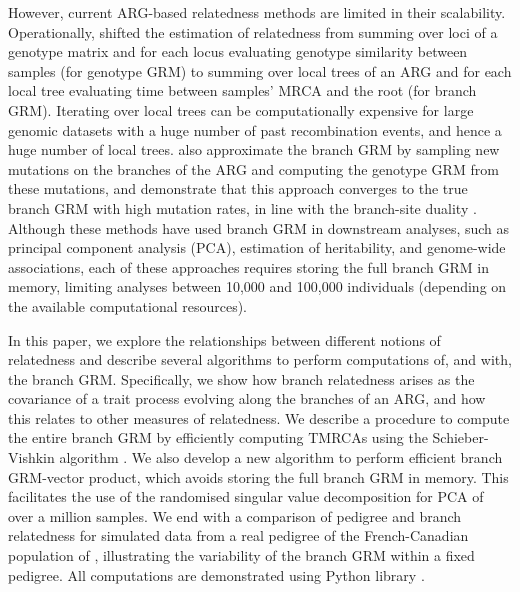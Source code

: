 However,
current ARG-based relatedness methods are limited in their scalability.
%
Operationally, \citet{fan2022genealogical} shifted the estimation of relatedness
from summing over loci of a genotype matrix and
for each locus evaluating genotype similarity between samples (for genotype GRM)
to summing over local trees of an ARG and
for each local tree evaluating time between samples' MRCA and the root (for branch GRM).
%
Iterating over local trees can be computationally expensive for large genomic datasets
with a huge number of past recombination events, and hence a huge number of local trees.
%
\citet{zhang2023biobank} also approximate the branch GRM
by sampling new mutations on the branches of the ARG and
computing the genotype GRM from these mutations,
and demonstrate that this approach converges to the true branch GRM with high mutation rates,
in line with the branch-site duality \citep{ralph2019empirical, ralph2020efficiently}.
%
Although these methods have used branch GRM in downstream analyses,
such as principal component analysis (PCA), estimation of heritability, and genome-wide associations,
each of these approaches requires storing the full branch GRM in memory,
limiting analyses between 10,000 and 100,000 individuals
(depending on the available computational resources).


In this paper, we explore the relationships between different notions of relatedness and
describe several algorithms to perform computations of, and with, the branch GRM.
%
Specifically, we show how branch relatedness arises as
the covariance of a trait process evolving along the branches of an ARG,
and how this relates to other measures of relatedness.
%
We describe a procedure to compute the entire branch GRM by efficiently computing TMRCAs
using the Schieber-Vishkin algorithm \citep{Schieber1988On}.
%
We also develop a new algorithm to perform efficient branch GRM-vector product,
which avoids storing the full branch GRM in memory.
%
This facilitates the use of the randomised singular value decomposition \citep{halko2011findingstructure}
for PCA of over a million samples.
%
We end with a comparison of pedigree and branch relatedness
for simulated data from a real pedigree of the French-Canadian population of
\citet{andersontrocme2023genes},
illustrating the variability of the branch GRM within a fixed pedigree.
%
All computations are demonstrated using Python \tskit{} library
\citep{ralph2020efficiently, kelleher2024tskit}.
